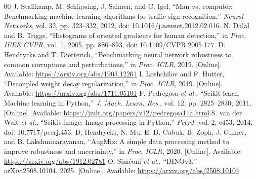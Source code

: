 \documentclass[conference]{IEEEtran}
\begin{document}
\begin{thebibliography}{00}
 J. Stallkamp, M. Schlipsing, J. Salmen, and C. Igel, ``Man vs. computer: Benchmarking machine learning algorithms for traffic sign recognition,'' \emph{Neural Networks}, vol. 32, pp. 323--332, 2012, doi: 10.1016/j.neunet.2012.02.016.
 N. Dalal and B. Triggs, ``Histograms of oriented gradients for human detection,'' in \emph{Proc. IEEE CVPR}, vol. 1, 2005, pp. 886--893, doi: 10.1109/CVPR.2005.177.
 D. Hendrycks and T. Dietterich, ``Benchmarking neural network robustness to common corruptions and perturbations,'' in \emph{Proc. ICLR}, 2019. [Online]. Available: \url{https://arxiv.org/abs/1903.12261}
 I. Loshchilov and F. Hutter, ``Decoupled weight decay regularization,'' in \emph{Proc. ICLR}, 2019. [Online]. Available: \url{https://arxiv.org/abs/1711.05101}
 F. Pedregosa \emph{et al.}, ``Scikit-learn: Machine learning in Python,'' \emph{J. Mach. Learn. Res.}, vol. 12, pp. 2825--2830, 2011. [Online]. Available: \url{https://jmlr.org/papers/v12/pedregosa11a.html}
 S. van der Walt \emph{et al.}, ``Scikit-image: Image processing in Python,'' \emph{PeerJ}, vol. 2, e453, 2014, doi: 10.7717/peerj.453.
 D. Hendrycks, N. Mu, E. D. Cubuk, B. Zoph, J. Gilmer, and B. Lakshminarayanan, ``AugMix: A simple data processing method to improve robustness and uncertainty,'' in \emph{Proc. ICLR}, 2020. [Online]. Available: \url{https://arxiv.org/abs/1912.02781}
 O. Sim\'eoni \emph{et al.}, ``DINOv3,'' arXiv:2508.10104, 2025. [Online]. Available: \url{https://arxiv.org/abs/2508.10104}
\end{thebibliography}
\end{document}
